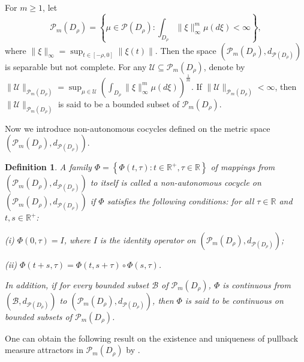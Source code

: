 \documentclass[11pt]{article}
\numberwithin{equation}{section}
\theoremstyle{plain}
\newtheorem{definition}{Definition}[section]
\begin{document}
 For $ m \ge 1 $, let
 $$ \mathcal{P}_m( D_{\rho} ) = \left\{ \mu \in \mathcal{P}(D_{\rho}): \int_{D_{\rho}} \|\xi\|_{ \infty }^m \mu(d\xi) < \infty \right\},
 $$
 where $\|\xi\|_{ \infty } = \sup_{t \in [-\rho,0]} \| \xi(t) \|$. Then
   the space $\left( \mathcal{P}_m( D_{\rho} ), d_{ \mathcal{P}( D_{\rho}) } \right)$ is separable but not complete.
 For any $\mathcal{U} \subseteq \mathcal{P}_m(D_{\rho})$, denote by
 $ \|\mathcal{U}\|_{\mathcal{P}_m(D_{\rho})}
   = \sup_{\mu \in \mathcal{U}}
                \left( \int_{D_{\rho}}
                             \| \xi \|^m_{\infty
                             } \mu(d \xi)
                \right)^{\frac{1}{m} }
 $.
 If $ \|\mathcal{U}\|_{\mathcal{P}_m(D_{\rho})}
 <\infty$, then $ \|\mathcal{U}\|_{\mathcal{P}_m(D_{\rho})}
 $
  is said to be a bounded subset of
  $\mathcal{P}_m(D_{\rho})$.

 Now we introduce non-autonomous cocycles  defined on the metric space $\left( \mathcal{P}_m(D_{\rho}), d_{\mathcal{P}(D_{\rho})} \right)$.

\begin{definition}\label{def_ds}
  A family $\Phi =
                           \left\{\Phi(t, \tau): t \in \mathbb{R}^+, \tau \in \mathbb{R}
                           \right\}$
  of mappings from $\left( \mathcal{P}_m(D_{\rho}), d_{\mathcal{P}(D_{\rho})} \right)$
  to itself %
  is called a non-autonomous cocycle on $\left( \mathcal{P}_m(D_{\rho}), d_{\mathcal{P}(D_{\rho})} \right)$
  if $ \Phi $ satisfies 
  the following conditions:
   for all $\tau \in \mathbb{R}$ and $t,s \in \mathbb{R}^+$:

  (i) $\Phi(0, \tau) = I$,
      where $ I $ is the identity operator on $\left( \mathcal{P}_m(D_{\rho}), d_{\mathcal{P}(D_{\rho})} \right)$;

  (ii) $\Phi(t+s, \tau) = \Phi(t,s+\tau) \circ \Phi(s,\tau)$.

  In addition, if for every bounded subset $\mathscr{B}$ of $ \mathcal{P}_m (D_{\rho}) $,
  $ \Phi $ is continuous from  $\left( \mathscr{B} , d_{\mathcal{P}(D_{\rho})} \right)$
  to $\left( \mathcal{P}_m(D_{\rho}),  d_{\mathcal{P}(D_{\rho})} \right)$,
  then   $\Phi$ is 
  said to be continuous on bounded subsets of $ \mathcal{P}_m(D_{\rho}) $.
\end{definition}

\iffalse%
  One can obtain the following result on the existence and uniqueness of pullback measure attractors in $\mathcal{P}_m(D_{\rho})$ by \cite[Proposition 2.2]{SSW2026JDE}.
\end{document}
